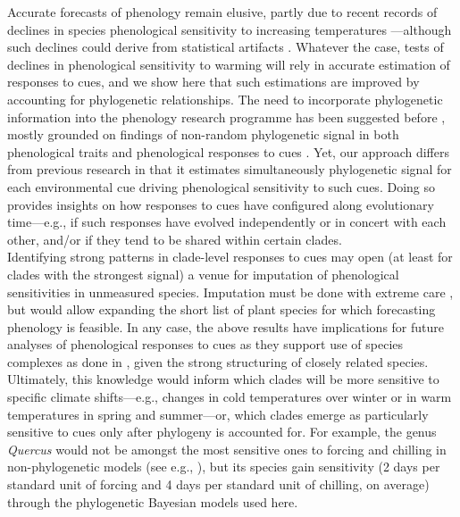 \documentclass{article}\usepackage[]{graphicx}\usepackage[]{color}
\begin{document}
Accurate forecasts of phenology remain elusive, partly due to recent records of declines in species phenological sensitivity to increasing temperatures \citep{fu2015,piao2017}---although such declines could derive from statistical artifacts \citep{wolkovich2021simple}. Whatever the case, tests of declines in phenological sensitivity to warming will rely in accurate estimation of responses to cues, and we show here that such estimations are improved by accounting for phylogenetic relationships. The need to incorporate phylogenetic information into the phenology research programme has been suggested before \citep{davies2013phylogenetic,joly2019importance}, mostly grounded on findings of non-random phylogenetic signal in both phenological traits \citep{davies2013phylogenetic,rafferty2017global} and phenological responses to cues \citep{davies2013phylogenetic,joly2019importance}. Yet, our approach differs from previous research in that it estimates simultaneously phylogenetic signal for each environmental cue driving phenological sensitivity to such cues. Doing so provides insights on how responses to cues have configured along evolutionary time---e.g., if such responses have evolved independently or in concert with each other, and/or if they tend to be shared within certain clades.\\ 


Identifying strong patterns in clade-level responses to cues may open (at least for clades with the strongest signal) a venue for imputation of phenological sensitivities in unmeasured species. Imputation must be done with extreme care \citep{molina2018assessing}, but would allow expanding the short list of plant species for which forecasting phenology is feasible. In any case, the above results have implications for future analyses of phenological responses to cues as they support use of species complexes as done in \cite{ettinger2020}, given the strong structuring of closely related species.\\ %



Ultimately, this knowledge would inform which clades will be more sensitive to specific climate shifts---e.g., changes in cold temperatures over winter or in warm temperatures in spring and summer---or, which clades emerge as particularly sensitive to cues only after phylogeny is accounted for. For example, the genus \emph{Quercus} would not be amongst the most sensitive ones to forcing and chilling in non-phylogenetic models (see e.g., \citep{ettinger2020}), but its species gain sensitivity (2 days per standard unit of forcing and 4 days per standard unit of chilling, on average) through the phylogenetic Bayesian models used here.\\ %
\end{document}
